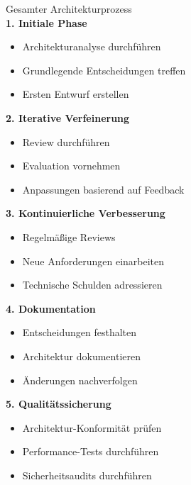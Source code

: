 \begin{KR}{Gesamter Architekturprozess}\\
\textbf{1. Initiale Phase}
\begin{itemize}
    \item Architekturanalyse durchführen
    \item Grundlegende Entscheidungen treffen
    \item Ersten Entwurf erstellen
\end{itemize}

\textbf{2. Iterative Verfeinerung}
\begin{itemize}
    \item Review durchführen
    \item Evaluation vornehmen
    \item Anpassungen basierend auf Feedback
\end{itemize}

\textbf{3. Kontinuierliche Verbesserung}
\begin{itemize}
    \item Regelmäßige Reviews
    \item Neue Anforderungen einarbeiten
    \item Technische Schulden adressieren
\end{itemize}

\textbf{4. Dokumentation}
\begin{itemize}
    \item Entscheidungen festhalten
    \item Architektur dokumentieren
    \item Änderungen nachverfolgen
\end{itemize}

\textbf{5. Qualitätssicherung}
\begin{itemize}
    \item Architektur-Konformität prüfen
    \item Performance-Tests durchführen
    \item Sicherheitsaudits durchführen
\end{itemize}
\end{KR}

